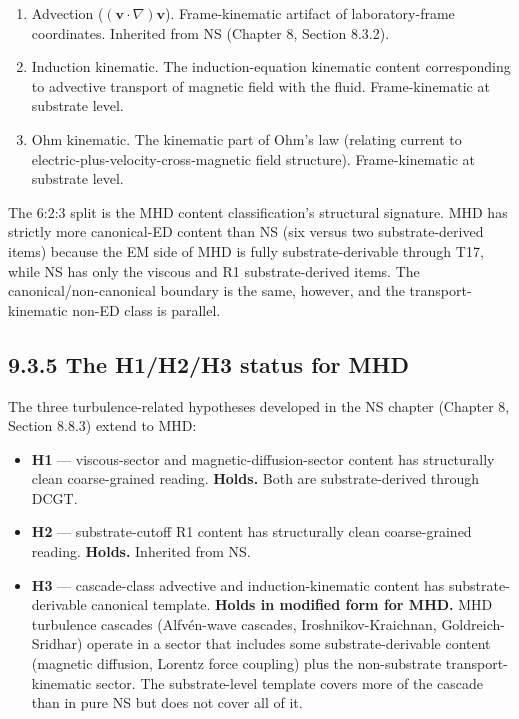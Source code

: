 \documentclass[11pt]{book}
\begin{document}
\begin{enumerate}
\item Advection ($(\mathbf{v}\cdot\nabla)\mathbf{v}$). Frame-kinematic artifact of laboratory-frame coordinates. Inherited from NS (Chapter 8, Section 8.3.2).
\item Induction kinematic. The induction-equation kinematic content corresponding to advective transport of magnetic field with the fluid. Frame-kinematic at substrate level.
\item Ohm kinematic. The kinematic part of Ohm's law (relating current to electric-plus-velocity-cross-magnetic field structure). Frame-kinematic at substrate level.
\end{enumerate}

The 6:2:3 split is the MHD content classification's structural signature. MHD has strictly more canonical-ED content than NS (six versus two substrate-derived items) because the EM side of MHD is fully substrate-derivable through T17, while NS has only the viscous and R1 substrate-derived items. The canonical/non-canonical boundary is the same, however, and the transport-kinematic non-ED class is parallel.

\subsection{9.3.5 The H1/H2/H3 status for MHD}

The three turbulence-related hypotheses developed in the NS chapter (Chapter 8, Section 8.8.3) extend to MHD:

\begin{itemize}
\item \textbf{H1} — viscous-sector and magnetic-diffusion-sector content has structurally clean coarse-grained reading. \textbf{Holds.} Both are substrate-derived through DCGT.
\item \textbf{H2} — substrate-cutoff R1 content has structurally clean coarse-grained reading. \textbf{Holds.} Inherited from NS.
\item \textbf{H3} — cascade-class advective and induction-kinematic content has substrate-derivable canonical template. \textbf{Holds in modified form for MHD.} MHD turbulence cascades (Alfvén-wave cascades, Iroshnikov-Kraichnan, Goldreich-Sridhar) operate in a sector that includes some substrate-derivable content (magnetic diffusion, Lorentz force coupling) plus the non-substrate transport-kinematic sector. The substrate-level template covers more of the cascade than in pure NS but does not cover all of it.
\end{itemize}
\end{document}
